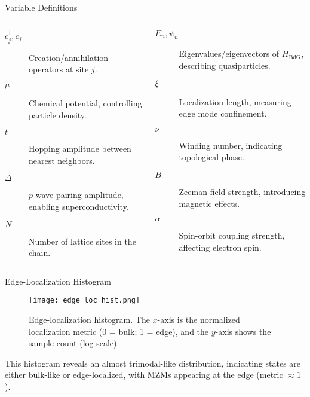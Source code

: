 \documentclass[aspectratio=169]{beamer}
\begin{document}
\begin{frame}{Variable Definitions}
\begin{columns}
\begin{column}{0.5\textwidth}
\begin{description}
\item[$c_j^\dagger, c_j$] Creation/annihilation operators at site $j$.
\item[$\mu$] Chemical potential, controlling particle density.
\item[$t$] Hopping amplitude between nearest neighbors.
\item[$\Delta$] $p$-wave pairing amplitude, enabling superconductivity.
\item[$N$] Number of lattice sites in the chain.
\end{description}
\end{column}
\begin{column}{0.5\textwidth}
\begin{description}
\item[$E_n, \psi_n$] Eigenvalues/eigenvectors of $H_{\mathrm{BdG}}$, describing quasiparticles.
\item[$\xi$] Localization length, measuring edge mode confinement.
\item[$\nu$] Winding number, indicating topological phase.
\item[$B$] Zeeman field strength, introducing magnetic effects.
\item[$\alpha$] Spin-orbit coupling strength, affecting electron spin.
\end{description}
\end{column}
\end{columns}
\end{frame}

\begin{frame}{Edge-Localization Histogram}
  \tiny

  \begin{figure}
    \centering
    \texttt{[image: edge\_loc\_hist.png]}
    \captionsetup{labelformat=empty,font=tiny}
    \caption{Edge-localization histogram. The $x$-axis is the normalized localization metric (0 = bulk; 1 = edge), and the $y$-axis shows the sample count (log scale).}
  \end{figure}
  This histogram reveals an almost trimodal-like distribution, indicating states are either bulk-like or edge-localized, with MZMs appearing at the edge (metric $\approx 1$).
\end{frame}
\end{document}
